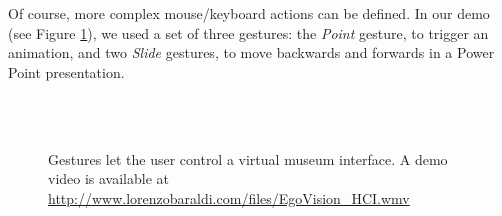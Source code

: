 Of course, more complex mouse/keyboard actions can be defined. In our demo (see Figure \ref{fig:projector}), we used a set of three gestures: the \textit{Point} gesture, to trigger an animation, and two \textit{Slide} gestures, to move backwards and forwards in a Power Point presentation.

\begin{figure}
\centering
{} \\
 \\
\caption{Gestures let the user control a virtual museum interface. A demo video is available at \url{http://www.lorenzobaraldi.com/files/EgoVision_HCI.wmv}}
\label{fig:projector}
\end{figure}